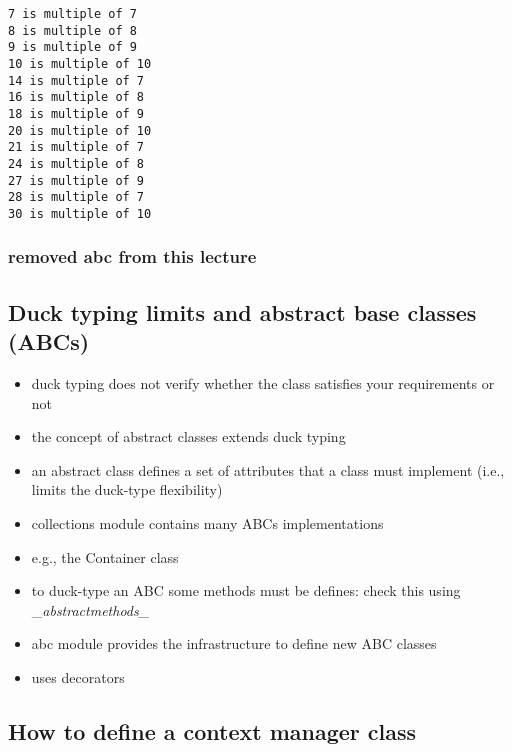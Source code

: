 \documentclass[11pt]{article}
\providecommand{\tightlist}{%
      \setlength{\itemsep}{0pt}\setlength{\parskip}{0pt}}
\begin{document}
    \begin{Verbatim}[commandchars=\\\{\}]
7 is multiple of 7
8 is multiple of 8
9 is multiple of 9
10 is multiple of 10
14 is multiple of 7
16 is multiple of 8
18 is multiple of 9
20 is multiple of 10
21 is multiple of 7
24 is multiple of 8
27 is multiple of 9
28 is multiple of 7
30 is multiple of 10
    \end{Verbatim}

    \hypertarget{removed-abc-from-this-lecture}{%
\subsubsection{removed abc from this
lecture}\label{removed-abc-from-this-lecture}}

\hypertarget{duck-typing-limits-and-abstract-base-classes-abcs}{%
\subsection{Duck typing limits and abstract base classes
(ABCs)}\label{duck-typing-limits-and-abstract-base-classes-abcs}}

\begin{itemize}
\tightlist
\item
  duck typing does not verify whether the class satisfies your
  requirements or not
\item
  the concept of abstract classes extends duck typing
\item
  an abstract class defines a set of attributes that a class must
  implement (i.e., limits the duck-type flexibility)
\item
  collections module contains many ABCs implementations
\item
  e.g., the Container class
\item
  to duck-type an ABC some methods must be defines: check this using
  \_\emph{abstractmethods\_}
\item
  abc module provides the infrastructure to define new ABC classes
\item
  uses decorators
\end{itemize}

    \hypertarget{how-to-define-a-context-manager-class}{%
\subsection{How to define a context manager
class}\label{how-to-define-a-context-manager-class}}
\end{document}
